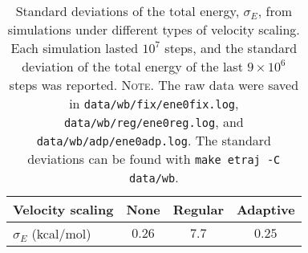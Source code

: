 \documentclass[reprint]{revtex4-1}
\newcommand{\note}[1]{{\color{DarkGreen}\footnotesize \textsc{Note.} #1}}
\begin{document}
\begin{table}[h]
  \setlength{\tabcolsep}{5pt}
  \renewcommand{\arraystretch}{1.5}
  \begin{center}
    \begin{tabular}{ p{2.5cm} | c c c }
      \hline
      Velocity scaling
      &   None    &   Regular   &   Adaptive \\
      \hline
      $\sigma_E$ (kcal/mol)
      &   $0.26$  &   $7.7$     &   $0.25$ \\
      \hline
    \end{tabular}
  \end{center}
  \caption{
    \label{tab:etraj}
    Standard deviations of the total energy, $\sigma_E$,
    from simulations under different types of velocity scaling.
    Each simulation lasted $10^7$ steps,
    and the standard deviation of the total energy
    of the last $9 \times 10^6$ steps was reported.
    \note{
      The raw data were saved in
      \texttt{data/wb/fix/ene0fix.log},
      \texttt{data/wb/reg/ene0reg.log},
      and
      \texttt{data/wb/adp/ene0adp.log}.
      The standard deviations can be found with
      \texttt{make etraj -C data/wb}.
    }%
  }
\end{table}

\end{document}
